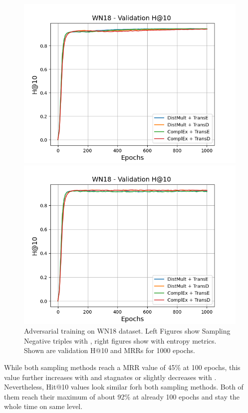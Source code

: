 \begin{figure}
\begin{minipage}{.5\textwidth}
    \end{minipage}
    \begin{minipage}{.5\textwidth}
      \centering
      \includegraphics[width=0.9\linewidth]{figures/results/gan_train/not_pretrained/random/wn18/epochs1000/random_wn18_hit10.png}
    \end{minipage}%
    \begin{minipage}{.5\textwidth}
      \centering
      \includegraphics[width=0.9\linewidth]{figures/results/gan_train/not_pretrained/uncertainty/max_distribution/entropy/wn18/1k_epochs/uncertainty_wn18_hit10.png}
    \end{minipage}%
    \caption{Adversarial training on \textsc{WN18} dataset. 
    Left Figures show Sampling Negative triples with \origsampling, right figures show \ussoftmax with entropy metrics.
    Shown are validation H@10 and MRRs for 1000 epochs.}
    \label{fig:advtrain_wn18_random_vs_uncertainty}
\end{figure}
While both sampling methods reach a MRR value of 45\% at 100 epochs, this value further increases with \origsampling and stagnates or slightly decreases with \ussoftmax.
Nevertheless, Hit@10 values look similar forh both sampling methods.
Both of them reach their maximum of about 92\% at already 100 epochs and stay the whole time on same level.

